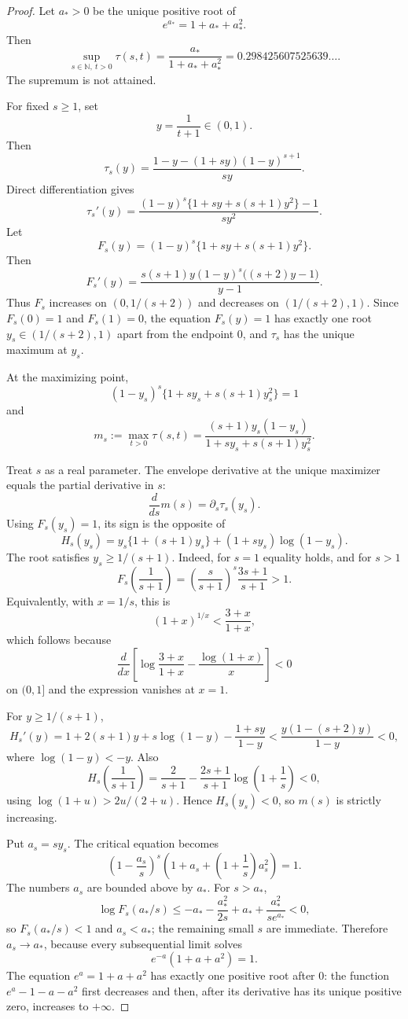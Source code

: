 \documentclass[11pt]{article}
\numberwithin{equation}{section}
\theoremstyle{definition}
\theoremstyle{remark}
\newcommand{\1}{\mathbf 1}
\begin{document}
\begin{proof}
Let \(a_*>0\) be the unique positive root of
\[
e^{a_*}=1+a_*+a_*^2.
\]
Then
\[
\sup_{s\in\mathbb N,\ t>0}\tau(s,t)
=\frac{a_*}{1+a_*+a_*^2}
=0.298425607525639\ldots.
\]
The supremum is not attained.

For fixed \(s\ge1\), set
\[
y=\frac1{t+1}\in(0,1).
\]
Then
\[
\tau_s(y)=\frac{1-y-(1+sy)(1-y)^{s+1}}{sy}.
\]
Direct differentiation gives
\[
\tau_s'(y)=
\frac{(1-y)^s\{1+sy+s(s+1)y^2\}-1}{s y^2}.
\]
Let
\[
F_s(y)=(1-y)^s\{1+sy+s(s+1)y^2\}.
\]
Then
\[
F_s'(y)=
\frac{s(s+1)y(1-y)^s\bigl((s+2)y-1\bigr)}{y-1}.
\]
Thus \(F_s\) increases on \((0,1/(s+2))\) and decreases on \((1/(s+2),1)\). Since \(F_s(0)=1\) and \(F_s(1)=0\), the equation \(F_s(y)=1\) has exactly one root \(y_s\in(1/(s+2),1)\) apart from the endpoint \(0\), and \(\tau_s\) has the unique maximum at \(y_s\).

At the maximizing point,
\[
(1-y_s)^s\{1+s y_s+s(s+1)y_s^2\}=1
\]
and
\[
m_s:=\max_{t>0}\tau(s,t)
=\frac{(s+1)y_s(1-y_s)}{1+s y_s+s(s+1)y_s^2}.
\]

Treat \(s\) as a real parameter. The envelope derivative at the unique maximizer equals the partial derivative in \(s\):
\[
\frac{d}{ds}m(s)=\partial_s\tau_s(y_s).
\]
Using \(F_s(y_s)=1\), its sign is the opposite of
\[
H_s(y_s)
=y_s\{1+(s+1)y_s\}+(1+s y_s)\log(1-y_s).
\]
The root satisfies \(y_s\ge1/(s+1)\). Indeed, for \(s=1\) equality holds, and for \(s>1\)
\[
F_s\!\left(\frac1{s+1}\right)
=\left(\frac{s}{s+1}\right)^s\frac{3s+1}{s+1}>1.
\]
Equivalently, with \(x=1/s\), this is
\[
(1+x)^{1/x}<\frac{3+x}{1+x},
\]
which follows because
\[
\frac{d}{dx}\left[\log\frac{3+x}{1+x}-\frac{\log(1+x)}x\right]<0
\]
on \((0,1]\) and the expression vanishes at \(x=1\).

For \(y\ge1/(s+1)\),
\[
H_s'(y)
=1+2(s+1)y+s\log(1-y)-\frac{1+sy}{1-y}
<\frac{y(1-(s+2)y)}{1-y}<0,
\]
where \(\log(1-y)<-y\). Also
\[
H_s\!\left(\frac1{s+1}\right)
=\frac2{s+1}-\frac{2s+1}{s+1}\log\left(1+\frac1s\right)<0,
\]
using \(\log(1+u)>2u/(2+u)\). Hence \(H_s(y_s)<0\), so \(m(s)\) is strictly increasing.

Put \(a_s=s y_s\). The critical equation becomes
\[
\left(1-\frac{a_s}{s}\right)^s
\left(1+a_s+\left(1+\frac1s\right)a_s^2\right)=1.
\]
The numbers \(a_s\) are bounded above by \(a_*\). For \(s>a_*\),
\[
\log F_s(a_*/s)
\le -a_*-\frac{a_*^2}{2s}
  +a_*+\frac{a_*^2}{s e^{a_*}}<0,
\]
so \(F_s(a_*/s)<1\) and \(a_s<a_*\); the remaining small \(s\) are immediate. Therefore \(a_s\to a_*\), because every subsequential limit solves
\[
e^{-a}(1+a+a^2)=1.
\]
The equation \(e^a=1+a+a^2\) has exactly one positive root after \(0\): the function \(e^a-1-a-a^2\) first decreases and then, after its derivative has its unique positive zero, increases to \(+\infty\).


\end{proof}
\end{document}
